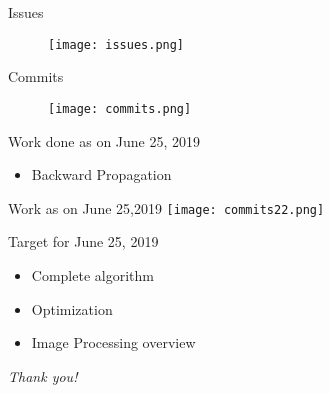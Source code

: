 \documentclass{beamer}
\begin{document}
\begin{frame}{Issues}
    \begin{figure}
        \centering
        \texttt{[image: issues.png]}
    \end{figure}
\end{frame}
    
\begin{frame}{Commits}
    \begin{figure}
        \centering
        \texttt{[image: commits.png]}
    \end{figure}
\end{frame}

\begin{frame}{Work done as on June 25, 2019}
    \begin{itemize}
        \item  Backward Propagation
       
    \end{itemize}
\end{frame}

\begin{frame}{Work as on June 25,2019}
\texttt{[image: commits22.png]}
    
\end{frame}


\begin{frame}{Target for June 25, 2019}
\begin{itemize}
\item Complete algorithm
    \item Optimization
    \item Image Processing overview
\end{itemize}
    
\end{frame}

        
\begin{frame}{}
  \centering \Large
  \color{blue}
  \emph{Thank you!}
\end{frame}
\end{document}
